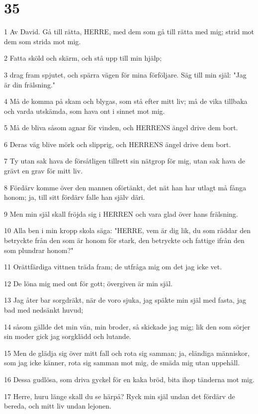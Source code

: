 \chapter{35}

\par 1 Av David. Gå till rätta, HERRE, med dem som gå till rätta med mig; strid mot dem som strida mot mig.
\par 2 Fatta sköld och skärm, och stå upp till min hjälp;
\par 3 drag fram spjutet, och spärra vägen för mina förföljare. Säg till min själ: "Jag är din frälsning."
\par 4 Må de komma på skam och blygas, som stå efter mitt liv; må de vika tillbaka och varda utskämda, som hava ont i sinnet mot mig.
\par 5 Må de bliva såsom agnar för vinden, och HERRENS ängel drive dem bort.
\par 6 Deras väg blive mörk och slipprig, och HERRENS ängel drive dem bort.
\par 7 Ty utan sak hava de försåtligen tillrett sin nätgrop för mig, utan sak hava de grävt en grav för mitt liv.
\par 8 Fördärv komme över den mannen oförtänkt, det nät han har utlagt må fånga honom; ja, till sitt fördärv falle han själv däri.
\par 9 Men min själ skall fröjda sig i HERREN och vara glad över hans frälsning.
\par 10 Alla ben i min kropp skola säga: "HERRE, vem är dig lik, du som räddar den betryckte från den som är honom för stark, den betryckte och fattige ifrån den som plundrar honom?"
\par 11 Orättfärdiga vittnen träda fram; de utfråga mig om det jag icke vet.
\par 12 De löna mig med ont för gott; övergiven är min själ.
\par 13 Jag åter bar sorgdräkt, när de voro sjuka, jag späkte min själ med fasta, jag bad med nedsänkt huvud;
\par 14 såsom gällde det min vän, min broder, så skickade jag mig; lik den som sörjer sin moder gick jag sorgklädd och lutande.
\par 15 Men de glädja sig över mitt fall och rota sig samman; ja, eländiga människor, som jag icke känner, rota sig samman mot mig, de smäda mig utan uppehåll.
\par 16 Dessa gudlösa, som driva gyckel för en kaka bröd, bita ihop tänderna mot mig.
\par 17 Herre, huru länge skall du se härpå? Ryck min själ undan det fördärv de bereda, och mitt liv undan lejonen.
